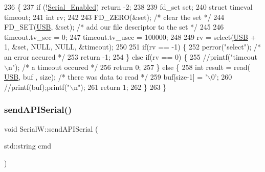 \begin{DoxyCode}
236                                            \{
237     \textcolor{keywordflow}{if} (!\hyperlink{class_serial_w_a557f72152ee772956c44fade26c1fd14}{Serial\_Enabled}) \textcolor{keywordflow}{return} -2;
238 
239     fd\_set \textcolor{keyword}{set};
240     \textcolor{keyword}{struct }timeval timeout;
241     \textcolor{keywordtype}{int} rv;
242 
243     FD\_ZERO(&\textcolor{keyword}{set}); \textcolor{comment}{/* clear the set */}
244     FD\_SET(\hyperlink{class_serial_w_addbc2cde514329294a30fd04da051ec8}{USB}, &\textcolor{keyword}{set}); \textcolor{comment}{/* add our file descriptor to the set */}
245 
246     timeout.tv\_sec = 0;
247     timeout.tv\_usec = 100000;
248 
249     rv = select(\hyperlink{class_serial_w_addbc2cde514329294a30fd04da051ec8}{USB} + 1, &\textcolor{keyword}{set}, NULL, NULL, &timeout);
250 
251     \textcolor{keywordflow}{if}(rv == -1) \{
252         perror(\textcolor{stringliteral}{"select"}); \textcolor{comment}{/* an error accured */}
253         \textcolor{keywordflow}{return} -1;
254     \} \textcolor{keywordflow}{else} \textcolor{keywordflow}{if}(rv == 0) \{
255         \textcolor{comment}{//printf("timeout \(\backslash\)n"); /* a timeout occured */}
256         \textcolor{keywordflow}{return} 0;
257     \} \textcolor{keywordflow}{else} \{
258         \textcolor{keywordtype}{int} result = read( \hyperlink{class_serial_w_addbc2cde514329294a30fd04da051ec8}{USB}, buf , size); \textcolor{comment}{/* there was data to read */}
259         buf[size-1] = \textcolor{charliteral}{'\(\backslash\)0'};
260         \textcolor{comment}{//printf(buf);printf("\(\backslash\)n");}
261         \textcolor{keywordflow}{return} 1;
262     \}
263 \}
\end{DoxyCode}
\mbox{\label{class_serial_w_a482e8608c6048b44b0772fecf8a922d9}} 
\subsubsection{\texorpdfstring{send\+A\+P\+I\+Serial()}{sendAPISerial()}}
{\footnotesize\ttfamily void Serial\+W\+::send\+A\+P\+I\+Serial (\begin{DoxyParamCaption}\item[{std\+::string}]{cmd }\end{DoxyParamCaption})}



